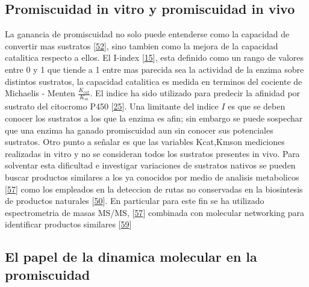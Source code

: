 \documentclass[12pt,twoside]{reedthesis}
\begin{document}
  \subsection{Promiscuidad in vitro y promiscuidad in
  vivo}\label{promiscuidad-in-vitro-y-promiscuidad-in-vivo}
  
  La ganancia de promiscuidad no solo puede entenderse como la capacidad
  de convertir mas sustratos
  {[}\protect\hyperlink{ref-carbonellux5fmolecularux5f2010}{52}{]}, sino
  tambien como la mejora de la capacidad catalitica respecto a ellos. El
  I-index {[}\protect\hyperlink{ref-nathux5fquantitativeux5f2008}{15}{]},
  esta definido como un rango de valores entre 0 y 1 que tiende a 1 entre
  mas parecida sea la actividad de la enzima sobre distintos sustratos, la
  capacidad catalitica es medida en terminos del cociente de Michaelis -
  Menten \(\frac{K_{cat}}{K_m}\). El indice ha sido utilizado para
  predecir la afinidad por sustrato del citocromo P450
  {[}\protect\hyperlink{ref-nathux5fquantifyingux5f2010}{25}{]}. Una
  limitante del indice \(I\) es que se deben conocer los sustratos a los
  que la enzima es afin; sin embargo se puede sospechar que una enzima ha
  ganado promiscuidad aun sin conocer sus potenciales sustratos. Otro
  punto a señalar es que las variables Kcat,Kmson mediciones realizadas in
  vitro y no se consideran todos los sustratos presentes in vivo. Para
  solventar esta dificultad e investigar variaciones de sustratos nativos
  se pueden buscar productos similares a los ya conocidos por medio de
  analisis metabolicos
  {[}\protect\hyperlink{ref-nesvizhskiiux5fanalysisux5f2007}{57}{]} como
  los empleados en la deteccion de rutas no conservadas en la biosintesis
  de productos naturales
  {[}\protect\hyperlink{ref-medemaux5fcomputationalux5f2015}{50}{]}. En
  particular para este fin se ha utilizado espectrometria de masas MS/MS,
  {[}\protect\hyperlink{ref-nesvizhskiiux5fanalysisux5f2007}{57}{]}
  combinada con molecular networking para identificar productos similares
  {[}\protect\hyperlink{ref-yangux5fmolecularux5f2013}{59}{]}
  
  \subsection{El papel de la dinamica molecular en la
  promiscuidad}\label{el-papel-de-la-dinamica-molecular-en-la-promiscuidad}
  
\end{document}
